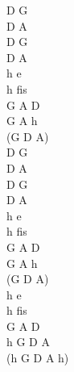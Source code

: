 \documentclass[a5paper, 10pt]{book}
\begin{document}
\begin{minipage}[t]{0.3\textwidth}
  D G\\
  D A \\
  D G\\
  D A\\
  h e \\
  h fis\\
  G A D\\
  G A h\\
  (G D A)\\

  D G\\
  D A \\
  D G\\
  D A\\
  h e \\
  h fis\\
  G A D\\
  G A h\\
  (G D A)\\

  h e\\
  h fis\\
  G A D\\
  h G D A\\
  (h G D A h)\\
\end{minipage}

\newpage
\end{document}
